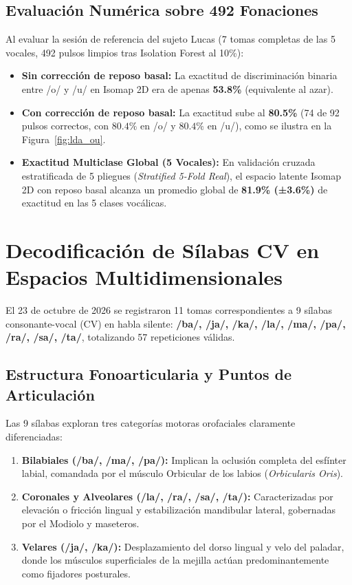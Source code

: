 \subsection{Evaluación Numérica sobre 492 Fonaciones}
Al evaluar la sesión de referencia del sujeto Lucas (7 tomas completas de las 5 vocales, 492 pulsos limpios tras Isolation Forest al 10\%):
\begin{itemize}
    \item \textbf{Sin corrección de reposo basal:} La exactitud de discriminación binaria entre /o/ y /u/ en Isomap 2D era de apenas \textbf{53.8\%} (equivalente al azar).
    \item \textbf{Con corrección de reposo basal:} La exactitud sube al \textbf{80.5\%} (74 de 92 pulsos correctos, con $80.4\%$ en /o/ y $80.4\%$ en /u/), como se ilustra en la Figura~\ref{fig:lda_ou}.
    \item \textbf{Exactitud Multiclase Global (5 Vocales):} En validación cruzada estratificada de 5 pliegues (\textit{Stratified 5-Fold Real}), el espacio latente Isomap 2D con reposo basal alcanza un promedio global de \textbf{81.9\% (±3.6\%)} de exactitud en las 5 clases vocálicas.
\end{itemize}

\section{Decodificación de Sílabas CV en Espacios Multidimensionales}
\label{sec:silabas_cv_experimentos}

El 23 de octubre de 2026 se registraron 11 tomas correspondientes a 9 sílabas consonante-vocal (CV) en habla silente: \textbf{/ba/, /ja/, /ka/, /la/, /ma/, /pa/, /ra/, /sa/, /ta/}, totalizando 57 repeticiones válidas.

\subsection{Estructura Fonoarticularia y Puntos de Articulación}
Las 9 sílabas exploran tres categorías motoras orofaciales claramente diferenciadas:
\begin{enumerate}
    \item \textbf{Bilabiales (/ba/, /ma/, /pa/):} Implican la oclusión completa del esfínter labial, comandada por el músculo Orbicular de los labios (\textit{Orbicularis Oris}).
    \item \textbf{Coronales y Alveolares (/la/, /ra/, /sa/, /ta/):} Caracterizadas por elevación o fricción lingual y estabilización mandibular lateral, gobernadas por el Modiolo y maseteros.
    \item \textbf{Velares (/ja/, /ka/):} Desplazamiento del dorso lingual y velo del paladar, donde los músculos superficiales de la mejilla actúan predominantemente como fijadores posturales.
\end{enumerate}

